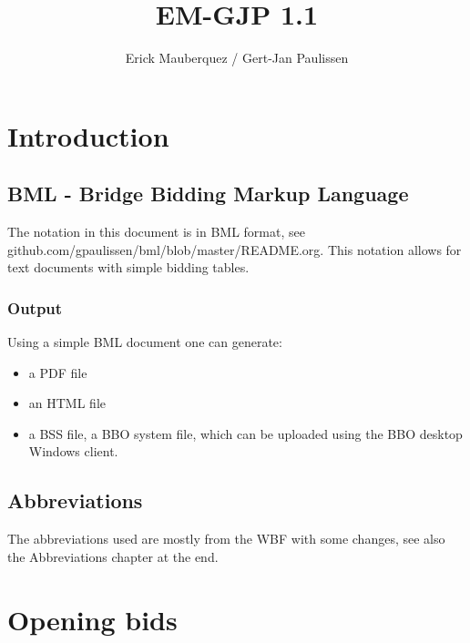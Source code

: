 \documentclass[a4paper]{article}
\title{EM-GJP 1.1}
\author{Erick Mauberquez / Gert-Jan Paulissen}
\begin{document}
\maketitle
\tableofcontents

\section{Introduction}

\subsection{BML - Bridge Bidding Markup Language}

The notation in this document is in BML format, see
github.com/gpaulissen/bml/blob/master/README.org.
\bigbreak
This notation allows for text documents with simple bidding tables.
\bigbreak
\subsubsection{Output}

Using a simple BML document one can generate:
\bigbreak
\begin{itemize}
\item a PDF file

\item an HTML file

\item a BSS file, a BBO system file, which can be uploaded using the BBO desktop Windows client.

\end{itemize}
\bigbreak
\subsection{Abbreviations}

The abbreviations used are mostly from the WBF with some changes, see also the
Abbreviations chapter at the end.
\bigbreak
\section{Opening bids}
\end{document}
